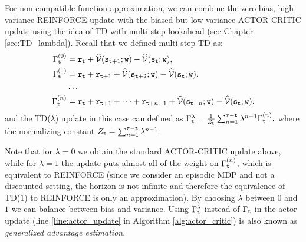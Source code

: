 For non-compatible function approximation, we can combine the zero-bias, high-variance REINFORCE update with the biased but low-variance ACTOR-CRITIC update using the idea of TD with multi-step lookahead (see Chapter \ref{sec:TD_lambda}). Recall that we defined multi-step TD as:
\begin{equation*}
    \begin{split}
        \Gamma^{(0)}_{\tt t} &= {\tt r}_{{\tt t}} + \widehat{\mathcal{V}}({\tt s}_{{\tt t}+1};{\tt w}) - \widehat{\mathcal{V}}({\tt s}_{{\tt t}};{\tt w}), \\
        \Gamma^{(1)}_{\tt t} &= {\tt r}_{{\tt t}} + {\tt r}_{{\tt t}+1} + \widehat{\mathcal{V}}({\tt s}_{{\tt t}+2};{\tt w}) - \widehat{\mathcal{V}}({\tt s}_{{\tt t}};{\tt w}), \\
        & \dots \\
        \Gamma^{(n)}_{\tt t} &= {\tt r}_{{\tt t}} + {\tt r}_{{\tt t}+1} + \dots + {\tt r}_{{\tt t}+n-1} + \widehat{\mathcal{V}}({\tt s}_{{\tt t}+n};{\tt w}) - \widehat{\mathcal{V}}({\tt s}_{{\tt t}};{\tt w}),
    \end{split}
\end{equation*}
and the TD($\lambda$) update in this case can defined as 
$\Gamma^{\lambda}_{\tt t} = \frac{1}{Z_{\tt t}}\sum_{n=1}^{\tau - {\tt t}}
\lambda^{n-1}\Gamma^{(n)}_{\tt t},$ where the normalizing constant $Z_{\tt t} = \sum_{n=1}^{\tau - {\tt t}}
\lambda^{n-1}$.  

Note that for $\lambda = 0$ we obtain the standard ACTOR-CRITIC update above, while for $\lambda = 1$ the update puts almost all of the weight on $\Gamma^{(n)}_{\tt t}$, which is equivalent to REINFORCE (since we consider an episodic MDP and not a discounted setting, the horizon is not infinite and therefore the equivalence of TD($1$) to REINFORCE is only an approximation). By choosing $\lambda$ between $0$ and $1$ we can balance between bias and variance. Using $\Gamma^{\lambda}_{\tt t}$ instead of $\Gamma_{\tt t}$ in the actor update (line \ref{line:actor_update} in Algorithm \ref{alg:actor_critic}) is also known as \textit{generalized advantage estimation}.





